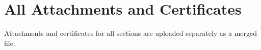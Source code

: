 \chapter{All Attachments and Certificates}

Attachments and certificates for all sections are uploaded separately as a merged file.
